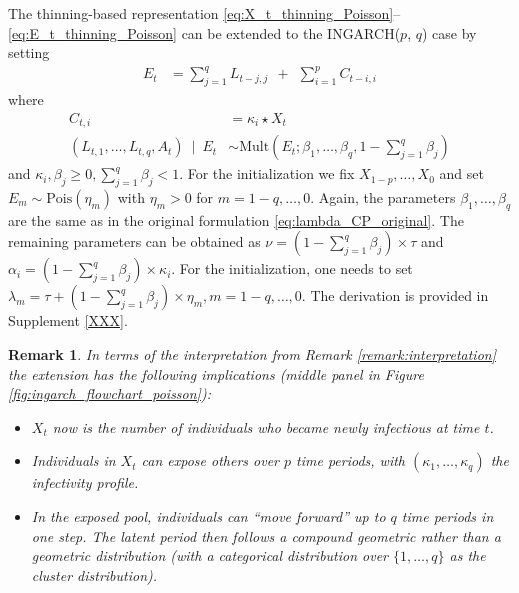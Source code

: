 \documentclass{article}
\newtheorem{remark}{Remark}
\begin{document}
The thinning-based representation \eqref{eq:X_t_thinning_Poisson}--\eqref{eq:E_t_thinning_Poisson} can be extended to the INGARCH($p$, $q$) case by setting
\begin{align}
E_t & = \sum_{j = 1}^q L_{t - j, j} \ \ + \ \ \sum_{i = 1}^p C_{t - i, i} \label{eq:Xt_thinning_pq}
\end{align}
where
\begin{align}
C_{t, i} & = \kappa_i \star X_t\\
(L_{t, 1}, \dots, L_{t, q}, A_t) \ \mid \ E_t & \sim \text{Mult}\left(E_t; \beta_1, \dots, \beta_q, 1 - \sum_{j = 1}^q \beta_j\right)\label{eq:L_t_mult}
\end{align}
and $\kappa_i, \beta_j \geq 0, \sum_{j = 1}^q \beta_j < 1$. For the initialization we fix $X_{1 - p}, \dots, X_0$ and set $E_{m} \sim \text{Pois}(\eta_m)$ with $\eta_m > 0$ for $m = 1 - q, \dots, 0$. Again, the parameters $\beta_{1}, \dots, \beta_q$ are the same as in the original formulation \eqref{eq:lambda_CP_original}. The remaining parameters can be obtained as $\nu = \left(1 - \sum_{j = 1}^q\beta_j \right) \times \tau$ and $\alpha_i = \left(1 - \sum_{j = 1}^q\beta_j \right) \times \kappa_i$. For the initialization, one needs to set $\lambda_m = \tau + (1 - \sum_{j = 1}^q\beta_j) \times \eta_m, m = 1 - q, \dots, 0$. The derivation is provided in Supplement \ref{XXX}.

\begin{remark}
In terms of the interpretation from Remark \ref{remark:interpretation} the extension has the following implications (middle panel in Figure \ref{fig:ingarch_flowchart_poisson}):
\begin{itemize}
\item $X_t$ now is the number of individuals who became \textit{newly} infectious at time $t$.%
\item Individuals in $X_t$ can expose others over $p$ time periods, with $(\kappa_1, \dots, \kappa_q)$ the infectivity profile. %
\item In the exposed pool, individuals can ``move forward'' up to $q$ time periods in one step. The latent period then follows a compound geometric rather than a geometric distribution (with a categorical distribution over $\{1, \dots, q\}$ as the cluster distribution). %
\end{itemize}
\end{remark}
\end{document}
